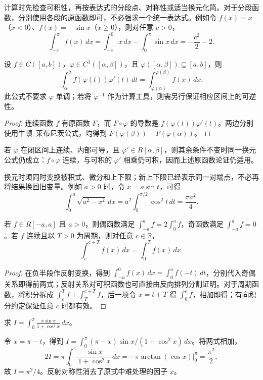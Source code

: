 \documentclass[UTF8,12pt,a4paper,fontset=fandol]{ctexbook}
\begin{document}
计算时先检查可积性，再按表达式的分段点、对称性或适当换元化简。对于分段函数，分别使用各段的原函数即可，不必强求一个统一表达式。例如令 $f(x)=x$（$x<0$）、$f(x)=-\sin x$（$x\geq0$），则对任意 $c>0$，
\[
    \int_{-c}^{\pi}f(x)\,dx
    =\int_{-c}^0x\,dx-\int_0^\pi\sin x\,dx
    =-\frac{c^2}{2}-2.
\]

\begin{theorem}[定积分换元公式]
\label{thm:definite-integral-substitution}
设 $f\in C([a,b])$，$\varphi\in C^1([\alpha,\beta])$，且 $\varphi([\alpha,\beta])\subseteq[a,b]$，则
\begin{equation}
    \int_\alpha^\beta f(\varphi(t))\varphi'(t)\,dt
    =\int_{\varphi(\alpha)}^{\varphi(\beta)}f(x)\,dx.
    \label{eq:definite-integral-substitution}
\end{equation}
此公式不要求 $\varphi$ 单调；若将 $\varphi^{-1}$ 作为计算工具，则需另行保证相应区间上的可逆性。
\end{theorem}
\begin{proof}
连续函数 $f$ 有原函数 $F$，而 $F\circ\varphi$ 的导数是 $f(\varphi(t))\varphi'(t)$。两边分别使用牛顿--莱布尼茨公式，均得到 $F(\varphi(\beta))-F(\varphi(\alpha))$。
\end{proof}

若 $\varphi$ 在闭区间上连续、内部可导，且 $\varphi'\in R[\alpha,\beta]$，则其余条件不变时同一换元公式仍成立：$f\circ\varphi$ 连续，与可积的 $\varphi'$ 相乘仍可积，因而上述原函数论证仍适用。

换元时须同时变换被积式、微分和上下限；新上下限已经表示同一对端点，不必再将结果换回旧变量。例如 $a>0$ 时，令 $x=a\sin t$，可得
\[
    \int_0^a\sqrt{a^2-x^2}\,dx
    =a^2\int_0^{\pi/2}\cos^2t\,dt=\frac{\pi a^2}{4}.
\]

\begin{proposition}[对称性与周期性]
\label{prop:integral-symmetry-and-periodicity}
若 $f\in R[-a,a]$ 且 $a>0$，则偶函数满足 $\int_{-a}^a f=2\int_0^a f$，奇函数满足 $\int_{-a}^a f=0$。若 $f$ 连续且以 $T>0$ 为周期，则对任意 $c\in\mathbb R$，
\[
    \int_c^{c+T}f(x)\,dx=\int_0^T f(x)\,dx.
\]
\end{proposition}
\begin{proof}
在负半段作反射变换，得到 $\int_{-a}^0f(x)\,dx=\int_0^af(-t)\,dt$，分别代入奇偶关系即得前两式；反射关系对可积函数也可直接由反向排列分割证明。对于周期函数，将积分拆成 $\int_c^T f+\int_T^{c+T}f$，后一项令 $x=t+T$ 得 $\int_0^cf$，相加即得；有向积分约定保证任意 $c$ 时都有效。
\end{proof}

\begin{example}
\label{ex:reflection-integral-x-sine}
求 $\displaystyle I=\int_0^\pi\frac{x\sin x}{1+\cos^2x}\,dx$。
\end{example}
\begin{solve}
令 $x=\pi-t$，得到 $I=\int_0^\pi(\pi-x)\sin x/(1+\cos^2x)\,dx$。将两式相加，
\[
    2I=\pi\int_0^\pi\frac{\sin x}{1+\cos^2x}\,dx
    =-\pi\left.\arctan(\cos x)\right|_0^\pi=\frac{\pi^2}{2},
\]
故 $I=\pi^2/4$。反射对称性消去了原式中难处理的因子 $x$。
\end{solve}
\end{document}
